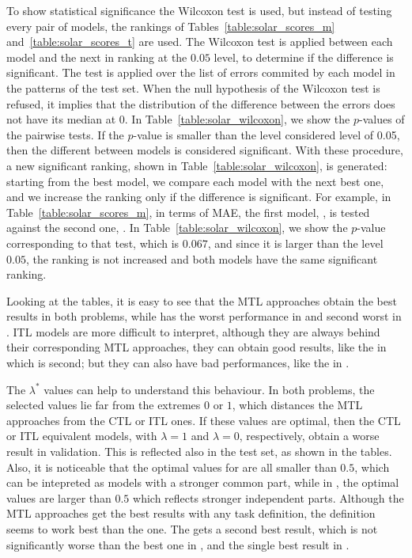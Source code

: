 To show statistical significance the Wilcoxon test is used, but instead of testing every pair of models, the rankings of Tables~\ref{table:solar_scores_m} and~\ref{table:solar_scores_t} are used. The Wilcoxon test is applied between each model and the next in ranking at the $0.05$ level, to determine if the difference is significant.
The test is applied over the list of errors commited by each model in the patterns of the test set. When the null hypothesis of the Wilcoxon test is refused, it implies that the distribution of the difference between the errors does not have its median at $0$.
In Table~\ref{table:solar_wilcoxon}, we show the $p$-values of the pairwise tests. If the $p$-value is smaller than the level considered level of 0.05, then the different between models is considered significant.
%
With these procedure, a new significant ranking, shown in Table~\ref{table:solar_wilcoxon},  is generated: starting from the best model, we compare each model with the next best one, and we increase the ranking only if the difference is significant.
%
For example, in Table~\ref{table:solar_scores_m}, in terms of MAE, the first model, , is tested against the second one, . In Table~\ref{table:solar_wilcoxon}, we show the $p$-value corresponding to that test, which is $0.067$, and since it is larger than the level $0.05$, the ranking is not increased and both models have the same significant ranking. 

%
Looking at the tables, it is easy to see that the MTL approaches obtain the best results in both problems, while  has the worst performance in  and second worst in .
ITL models are more difficult to interpret, although they are always behind their corresponding MTL approaches, they can obtain good results, like the  in  which is second; but they can also have bad performances, like the  in .

%
The $\lambda^*$ values can help to understand this behaviour. In both problems, the selected values lie far from the extremes $0$ or $1$, which distances the MTL approaches from the CTL or ITL ones. If these values are optimal, then the CTL or ITL equivalent models, with $\lambda=1$ and $\lambda=0$, respectively, obtain a worse result in validation. This is reflected also in the test set, as shown in the tables.
Also, it is noticeable that the optimal values for  are all smaller than $0.5$, which can be intepreted as models with a stronger common part, while in , the optimal values are larger than $0.5$ which reflects stronger independent parts.
%
Although the MTL approaches get the best results with any task definition, the  definition seems to work best than the  one. The  gets a second best result, which is not significantly worse than the best one in , and the single best result in .

